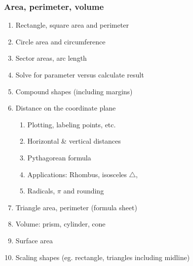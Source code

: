 \documentclass[12pt, oneside]{article}
\begin{document}
\subsubsection*{Area, perimeter, volume}
  \begin{enumerate}
  \item Rectangle, square area and perimeter
  \item Circle area and circumference
  \item Sector areas, arc length
  \item Solve for parameter versus calculate result
  \item Compound shapes (including margins)
  \item Distance on the coordinate plane
  \begin{enumerate}
    \item Plotting, labeling points, etc.
    \item Horizontal \& vertical distances
    \item Pythagorean formula
    \item Applications: Rhombus, isosceles $\triangle$,
    \item Radicals, $\pi$ and rounding
    \end{enumerate}
  \item Triangle area, perimeter (formula sheet)
  \item Volume: prism, cylinder, cone
  \item Surface area
  \item Scaling shapes (eg. rectangle, triangles including midline)
  \end{enumerate}
\end{document}
